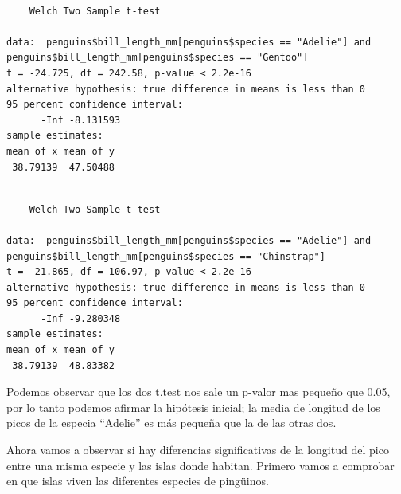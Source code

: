 \documentclass[
  letterpaper,
  DIV=11,
  numbers=noendperiod]{scrartcl}
\newenvironment{Shaded}{\begin{snugshade}}{\end{snugshade}}
\newcommand{\AttributeTok}[1]{\textcolor[rgb]{0.40,0.45,0.13}{#1}}
\newcommand{\ConstantTok}[1]{\textcolor[rgb]{0.56,0.35,0.01}{#1}}
\newcommand{\FloatTok}[1]{\textcolor[rgb]{0.68,0.00,0.00}{#1}}
\newcommand{\FunctionTok}[1]{\textcolor[rgb]{0.28,0.35,0.67}{#1}}
\newcommand{\NormalTok}[1]{\textcolor[rgb]{0.00,0.23,0.31}{#1}}
\newcommand{\SpecialCharTok}[1]{\textcolor[rgb]{0.37,0.37,0.37}{#1}}
\newcommand{\StringTok}[1]{\textcolor[rgb]{0.13,0.47,0.30}{#1}}
\begin{document}
\begin{verbatim}

    Welch Two Sample t-test

data:  penguins$bill_length_mm[penguins$species == "Adelie"] and penguins$bill_length_mm[penguins$species == "Gentoo"]
t = -24.725, df = 242.58, p-value < 2.2e-16
alternative hypothesis: true difference in means is less than 0
95 percent confidence interval:
      -Inf -8.131593
sample estimates:
mean of x mean of y 
 38.79139  47.50488 
\end{verbatim}

\begin{Shaded}
\end{Shaded}

\begin{verbatim}

    Welch Two Sample t-test

data:  penguins$bill_length_mm[penguins$species == "Adelie"] and penguins$bill_length_mm[penguins$species == "Chinstrap"]
t = -21.865, df = 106.97, p-value < 2.2e-16
alternative hypothesis: true difference in means is less than 0
95 percent confidence interval:
      -Inf -9.280348
sample estimates:
mean of x mean of y 
 38.79139  48.83382 
\end{verbatim}

Podemos observar que los dos t.test nos sale un p-valor mas pequeño que
0.05, por lo tanto podemos afirmar la hipótesis inicial; la media de
longitud de los picos de la especia ``Adelie'' es más pequeña que la de
las otras dos.

Ahora vamos a observar si hay diferencias significativas de la longitud
del pico entre una misma especie y las islas donde habitan. Primero
vamos a comprobar en que islas viven las diferentes especies de
pingüinos.

\begin{Shaded}
\end{Shaded}
\end{document}

